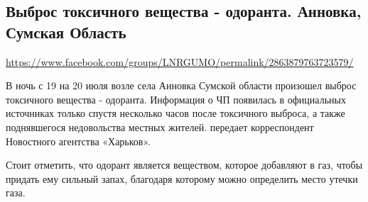  
 
\subsection{Выброс токсичного вещества - одоранта. Анновка, Сумская Область}
\label{sec:21_07_2020.fb.lnr.15}
\url{https://www.facebook.com/groups/LNRGUMO/permalink/2863879763723579/}
  

В ночь с 19 на 20 июля возле села Анновка Сумской области произошел выброс
токсичного вещества - одоранта. Информация о ЧП появилась в официальных
источниках только спустя несколько часов после токсичного выброса, а также
поднявшегося недовольства местных жителей. передает корреспондент Новостного
агентства «Харьков».  

Стоит отметить, что одорант является веществом, которое добавляют в газ, чтобы
придать ему сильный запах, благодаря которому можно определить место утечки
газа.

  
